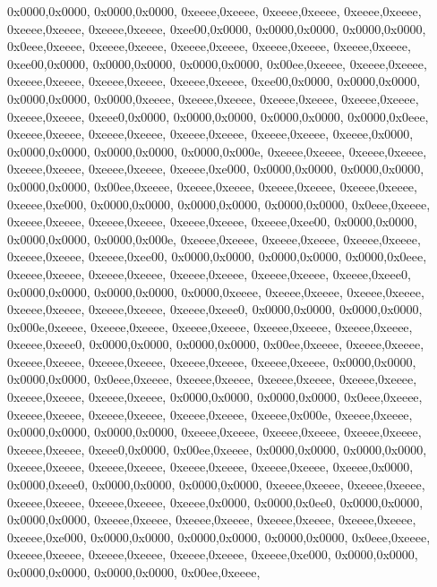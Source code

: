 {	0x0000,0x0000,
	0x0000,0x0000,
	0xeeee,0xeeee,
	0xeeee,0xeeee,
	0xeeee,0xeeee,
	0xeeee,0xeeee,
	0xeeee,0xeeee,
	0xee00,0x0000,
	0x0000,0x0000,
	0x0000,0x0000,
	0x0eee,0xeeee,
	0xeeee,0xeeee,
	0xeeee,0xeeee,
	0xeeee,0xeeee,
	0xeeee,0xeeee,
	0xee00,0x0000,
	0x0000,0x0000,
	0x0000,0x0000,
	0x00ee,0xeeee,
	0xeeee,0xeeee,
	0xeeee,0xeeee,
	0xeeee,0xeeee,
	0xeeee,0xeeee,
	0xee00,0x0000,
	0x0000,0x0000,
	0x0000,0x0000,
	0x0000,0xeeee,
	0xeeee,0xeeee,
	0xeeee,0xeeee,
	0xeeee,0xeeee,
	0xeeee,0xeeee,
	0xeee0,0x0000,
	0x0000,0x0000,
	0x0000,0x0000,
	0x0000,0x0eee,
	0xeeee,0xeeee,
	0xeeee,0xeeee,
	0xeeee,0xeeee,
	0xeeee,0xeeee,
	0xeeee,0x0000,
	0x0000,0x0000,
	0x0000,0x0000,
	0x0000,0x000e,
	0xeeee,0xeeee,
	0xeeee,0xeeee,
	0xeeee,0xeeee,
	0xeeee,0xeeee,
	0xeeee,0xe000,
	0x0000,0x0000,
	0x0000,0x0000,
	0x0000,0x0000,
	0x00ee,0xeeee,
	0xeeee,0xeeee,
	0xeeee,0xeeee,
	0xeeee,0xeeee,
	0xeeee,0xe000,
	0x0000,0x0000,
	0x0000,0x0000,
	0x0000,0x0000,
	0x0eee,0xeeee,
	0xeeee,0xeeee,
	0xeeee,0xeeee,
	0xeeee,0xeeee,
	0xeeee,0xee00,
	0x0000,0x0000,
	0x0000,0x0000,
	0x0000,0x000e,
	0xeeee,0xeeee,
	0xeeee,0xeeee,
	0xeeee,0xeeee,
	0xeeee,0xeeee,
	0xeeee,0xee00,
	0x0000,0x0000,
	0x0000,0x0000,
	0x0000,0x0eee,
	0xeeee,0xeeee,
	0xeeee,0xeeee,
	0xeeee,0xeeee,
	0xeeee,0xeeee,
	0xeeee,0xeee0,
	0x0000,0x0000,
	0x0000,0x0000,
	0x0000,0xeeee,
	0xeeee,0xeeee,
	0xeeee,0xeeee,
	0xeeee,0xeeee,
	0xeeee,0xeeee,
	0xeeee,0xeee0,
	0x0000,0x0000,
	0x0000,0x0000,
	0x000e,0xeeee,
	0xeeee,0xeeee,
	0xeeee,0xeeee,
	0xeeee,0xeeee,
	0xeeee,0xeeee,
	0xeeee,0xeee0,
	0x0000,0x0000,
	0x0000,0x0000,
	0x00ee,0xeeee,
	0xeeee,0xeeee,
	0xeeee,0xeeee,
	0xeeee,0xeeee,
	0xeeee,0xeeee,
	0xeeee,0xeeee,
	0x0000,0x0000,
	0x0000,0x0000,
	0x0eee,0xeeee,
	0xeeee,0xeeee,
	0xeeee,0xeeee,
	0xeeee,0xeeee,
	0xeeee,0xeeee,
	0xeeee,0xeeee,
	0x0000,0x0000,
	0x0000,0x0000,
	0x0eee,0xeeee,
	0xeeee,0xeeee,
	0xeeee,0xeeee,
	0xeeee,0xeeee,
	0xeeee,0x000e,
	0xeeee,0xeeee,
	0x0000,0x0000,
	0x0000,0x0000,
	0xeeee,0xeeee,
	0xeeee,0xeeee,
	0xeeee,0xeeee,
	0xeeee,0xeeee,
	0xeee0,0x0000,
	0x00ee,0xeeee,
	0x0000,0x0000,
	0x0000,0x0000,
	0xeeee,0xeeee,
	0xeeee,0xeeee,
	0xeeee,0xeeee,
	0xeeee,0xeeee,
	0xeeee,0x0000,
	0x0000,0xeee0,
	0x0000,0x0000,
	0x0000,0x0000,
	0xeeee,0xeeee,
	0xeeee,0xeeee,
	0xeeee,0xeeee,
	0xeeee,0xeeee,
	0xeeee,0x0000,
	0x0000,0x0ee0,
	0x0000,0x0000,
	0x0000,0x0000,
	0xeeee,0xeeee,
	0xeeee,0xeeee,
	0xeeee,0xeeee,
	0xeeee,0xeeee,
	0xeeee,0xe000,
	0x0000,0x0000,
	0x0000,0x0000,
	0x0000,0x0000,
	0x0eee,0xeeee,
	0xeeee,0xeeee,
	0xeeee,0xeeee,
	0xeeee,0xeeee,
	0xeeee,0xe000,
	0x0000,0x0000,
	0x0000,0x0000,
	0x0000,0x0000,
	0x00ee,0xeeee,
}
